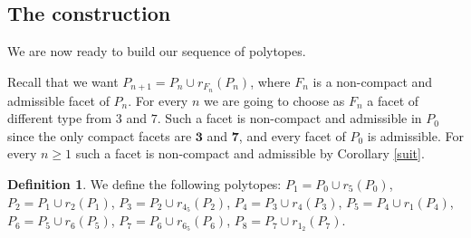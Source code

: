 \documentclass{amsart}
\theoremstyle{definition}
\newtheorem{defn}[lemma]{Definition}
\theoremstyle{remark}
\begin{document}


\subsection{The construction}\label{costruzione}
We are now ready to build our sequence of polytopes.

Recall that we want $P_{n+1}=P_n\cup r_{F_n}(P_n)$, where $F_n$ is a non-compact and admissible facet of $P_n$. For every $n$ we are going to choose as $F_n$ a facet of different type from $3$ and $7$. Such a facet is non-compact and admissible in $P_0$ since the only compact facets are $\textbf{3}$ and $\textbf{7}$, and every facet of $P_0$ is admissible. For every $n\ge 1$ such a facet is non-compact and admissible by Corollary \ref{suit}.

\begin{defn}
We define the following polytopes: $P_1=P_0\cup r_5(P_0)$, $P_2=P_1\cup r_2(P_1)$, $P_3=P_2\cup r_{4_5}(P_2)$, $P_4=P_3\cup r_4(P_3)$, $P_5=P_4\cup r_1(P_4)$, $P_6=P_5\cup r_6(P_5)$, $P_7=P_6\cup r_{6_5}(P_6)$, $P_8=P_7\cup r_{1_2}(P_7)$.
\end{defn}
\end{document}
